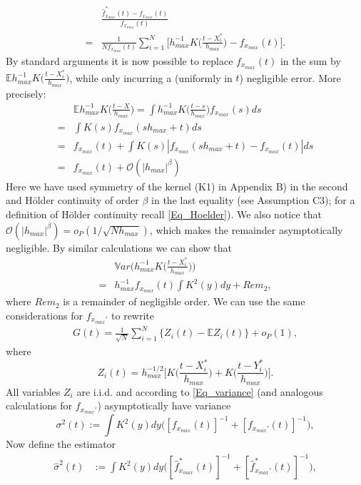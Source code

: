 \documentclass[conference]{IEEEtran}
\begin{document}
\begin{align*}
&\frac{\hat f_{x_{max}}^*(t)- f_{x_{max}}(t)}{f_{x_{max}}(t) }\\
=&\frac{1}{N f_{x_{max}}(t)} \sum_{i=1}^N  \Big[ h_{max}^{-1}K\Big(\frac{t-X_i^*}{h_{max}} \Big)- f_{x_{max}}(t) \Big].
\end{align*}
By standard arguments it is now possible to replace $f_{x_{max}}(t)$ in the sum by $\mathbb{E} h_{max}^{-1}K\big(\frac{t-X_i^*}{h_{max}}\big)$, while only incurring a (uniformly in $t$) negligible error. More precisely:
\begin{align*}
    & \mathbb{E}h_{max}^{-1} K \Big(\frac{t-X}{h_{max}}\Big) = \int h_{max}^{-1}K \Big(\frac{t-s}{h_{max}}\Big) f_{x_{max}}(s)ds \\
    =&  \int K(s) f_{x_{max}}(sh_{max}+t) ds \\
    = & f_{x_{max}}(t) +\int K(s) |f_{x_{max}}(sh_{max}+t)-f_{x_{max}}(t)| ds \\
    = & f_{x_{max}}(t)+ \mathcal{O}(|h_{max}|^\beta)
\end{align*}
Here we have used symmetry of the kernel (K1) in Appendix B) in the second and Hölder continuity of order $\beta$ in the last equality (see Assumption C3); for a definition of Hölder continuity recall \eqref{Eq_Hoelder}). We also notice that $\mathcal{O}(|h_{max}|^\beta) = o_P(1/\sqrt{N h_{max}})$, which makes the remainder asymptotically negligible. By similar calculations we can show that
\begin{align} \label{Eq_variance}
& \mathbb{V}ar \Big( h_{max}^{-1}K\Big(\frac{t-X_i^*}{h_{max}}\Big) \Big) \\
=& h_{max}^{-1} f_{x_{max}}(t) \int K^2(y) dy + Rem_2, \nonumber
\end{align}
where $Rem_2$ is a remainder of negligible order. We can use the same considerations for $f_{x_{max}'}$ to rewrite 
\begin{align*}
    G(t) = \frac{1}{\sqrt{N}}\sum_{i=1}^N \{Z_i(t)-\mathbb{E}Z_i(t)\} + o_P(1),
\end{align*}
where 
$$
Z_i(t) = h_{max}^{-1/2} \Big[ K\Big( \frac{t-X_i^*}{h_{max}}\Big)+ K\Big( \frac{t-Y_i^*}{h_{max}}\Big) \Big].
$$
All variables $Z_i$ are i.i.d. and according to \eqref{Eq_variance} (and analogous calculations for $f_{x_{max}'}$) asymptotically have variance
$$
\sigma^2(t) := \int K^2(y) dy \big([f_{x_{max}}(t)]^{-1} +  [f_{x_{max}'}(t)]^{-1}\big),
$$
 Now define the estimator 
\begin{align*}
\hat \sigma^2(t)& := \int K^2(y) dy  \big([\hat f_{x_{max}}^*(t)]^{-1} + [\hat f_{x_{max}'}^*(t)]^{-1}\big),
\end{align*}
\end{document}
